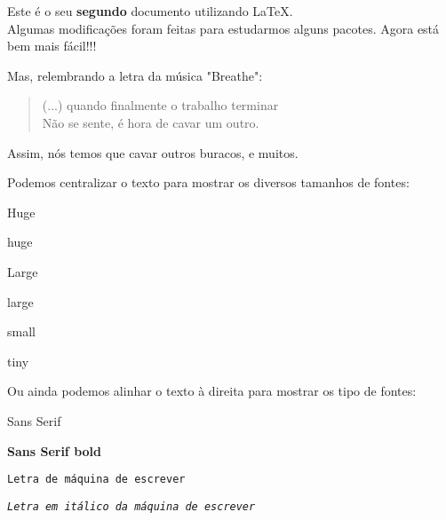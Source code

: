 \documentclass[10pt]{article}
\begin{document}
\noindent
Este é o seu {\bf segundo} documento utilizando \LaTeX.\\
Algumas modificações foram
 feitas para estudarmos alguns
pacotes. Agora está bem mais fácil!!!

Mas, relembrando a letra da música "Breathe":

\begin{quote}
(...) quando finalmente o trabalho terminar\\
Não se sente, é hora de cavar um outro.
\end{quote}

Assim, nós temos que cavar outros buracos, e muitos.

\newpage

\begin{center}
Podemos centralizar o texto para mostrar os diversos tamanhos de fontes:

\vspace{0.5cm}

{\Huge Huge}

\vspace{0.5cm}

{\huge huge}

\vspace{0.5cm}

{\Large Large}

\vspace{0.5cm}

{\large large}

\vspace{0.5cm}

{\small small}

\vspace{0.5cm}

{\small tiny}

\end{center}

\begin{flushright}
Ou ainda podemos alinhar o texto à direita para mostrar os tipo de fontes:

\vspace{0.5cm}

{\sffamily Sans Serif}

\vspace{0.5cm}

{\bf {\sffamily Sans Serif bold}}

\vspace{0.5cm}

\texttt{Letra de máquina de escrever}

\vspace{0.5cm}

{\it \texttt{Letra em itálico da máquina de escrever}}

\end{flushright}


\end{document}
